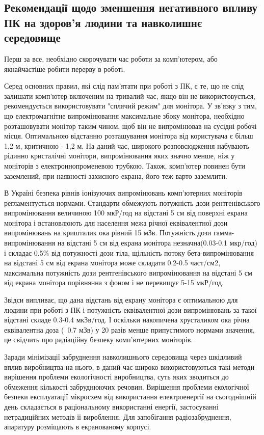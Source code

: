 \subsection{Рекомендації щодо зменшення негативного впливу ПК на здоров'я
 людини та навколишнє середовище}

Перш за все, необхідно    скорочувати   час    роботи   за   комп'ютером, або якнайчастіше робити перерву в роботі. 

Серед основних правил, які слід пам’ятати при роботі з ПК, є те, що не слід залишати комп'ютер включеним на 
тривалий час, якщо він не використовується, рекомендується використовувати "сплячий режим"     для     монітора.     
У зв'язку з тим, що електромагнітне випромінювання максимальне збоку монітора,   необхідно розташовувати монітор 
таким чином, щоб він не випромінював на сусідні робочі місця. Оптимальною відстанню розташування монітора від 
користувача є більш 1,2 м, критичною - 1,2 м. На даний час, широкого розповсюдження набувають рідинно кристалічні 
монітори, випромінювання яких значно	менше,	ніж у моніторів з    електроннопроменевою трубкою. Також, комп'ютер 
повинен бути заземлений, при наявності захисного екрана, його теж варто заземлити.

В Україні безпека рівнів іонізуючих випромінювань комп'ютерних моніторів регламентується нормами. Стандарти 
обмежують потужність дози рентгенівського випромінювання величиною 100 мкР/год на відстані 5 см від поверхні екрана 
монітора і встановлюють для населення межа річної еквівалентної дози випромінювань на кришталик ока рівний 15 мЗв. 
Потужність дози гамма-випромінювання на відстані 5 см від екрана монітора незначна(0.03-0.1 мкр/год) і складає 0.5\% 
від потужності дози тіла, щільність потоку бета-випромінювання на відстані 5 см від екрана монітора може складати 0.2-0.5 
част/см2, максимальна потужність дози рентгенівського випромінювання на відстані 5 см від екрана монітора порівнянна з фоном 
і не перевищує 5-15 мкР/год. 

Звідси випливає, що дана відстань від екрану монітора є оптимальною для людини при роботі з ПК і потужність 
еквівалентної дози випромінювань за такої відстані складе 0.3-0.4 мкЗв/год. І оскільки накопичена хрусталиком 
ока річна еквівалентна доза (~0.7 мЗв) у 20 разів менше припустимого нормами значення, це свідчить про 
радіаційну безпеку комп'ютерних моніторів.

Заради мінімізації забруднення навколишнього середовища через шкідливий вплив виробництва на нього, 
в даний час широко використовуються такі методи вирішення проблеми екологічності виробництва, 
суть яких зводиться до обмеження кількості забруднюючих речовин. Вирішення проблеми екологічної 
безпеки експлуатації мікросхем від використання електроенергії на сьогоднішній день складається в 
раціональному використанні енергії, застосуванні нетрадиційних методів її вироблення. Для запобігання 
радіозабруднення, апаратуру розміщають в екранованому корпусі.

% 


